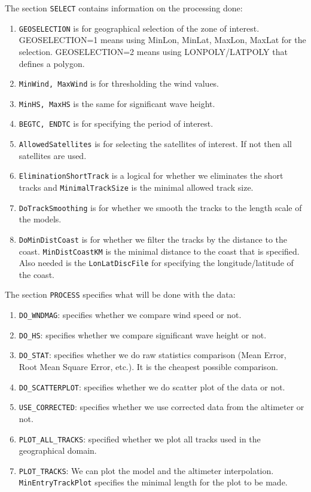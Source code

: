 \documentclass[12pt]{amsart}
\begin{document}
The section {\tt SELECT} contains information on the processing done:
\begin{enumerate}
\item {\tt GEOSELECTION} is for geographical selection of the zone of interest. GEOSELECTION=1 means using MinLon, MinLat, MaxLon, MaxLat for the selection. GEOSELECTION=2 means using LONPOLY/LATPOLY that defines a polygon.
\item {\tt MinWind, MaxWind} is for thresholding the wind values.
\item {\tt MinHS, MaxHS} is the same for significant wave height.
\item {\tt BEGTC, ENDTC} is for specifying the period of interest.
\item {\tt AllowedSatellites} is for selecting the satellites of interest. If not then all satellites are used.
\item {\tt EliminationShortTrack} is a logical for whether we eliminates the short tracks and {\tt MinimalTrackSize} is the minimal allowed track size.
\item {\tt DoTrackSmoothing} is for whether we smooth the tracks to the length scale of the models.
\item {\tt DoMinDistCoast} is for whether we filter the tracks by the distance to the coast. {\tt MinDistCoastKM} is the minimal distance to the coast that is specified. Also needed is the {\tt LonLatDiscFile} for specifying the longitude/latitude of the coast.
\end{enumerate}

The section {\tt PROCESS} specifies what will be done with the data:
\begin{enumerate}
\item {\tt DO\_WNDMAG}: specifies whether we compare wind speed or not.
\item {\tt DO\_HS}: specifies whether we compare significant wave height or not.
\item {\tt DO\_STAT}: specifies whether we do raw statistics comparison (Mean Error, Root Mean Square Error, etc.). It is the cheapest possible comparison.
\item {\tt DO\_SCATTERPLOT}: specifies whether we do scatter plot of the data or not.
\item {\tt USE\_CORRECTED}: specifies whether we use corrected data from the altimeter or not.
\item {\tt PLOT\_ALL\_TRACKS}: specified whether we plot all tracks used in the geographical domain.
\item {\tt PLOT\_TRACKS}: We can plot the model and the altimeter interpolation. {\tt MinEntryTrackPlot} specifies the minimal length for the plot to be made.
\end{enumerate}
\end{document}
